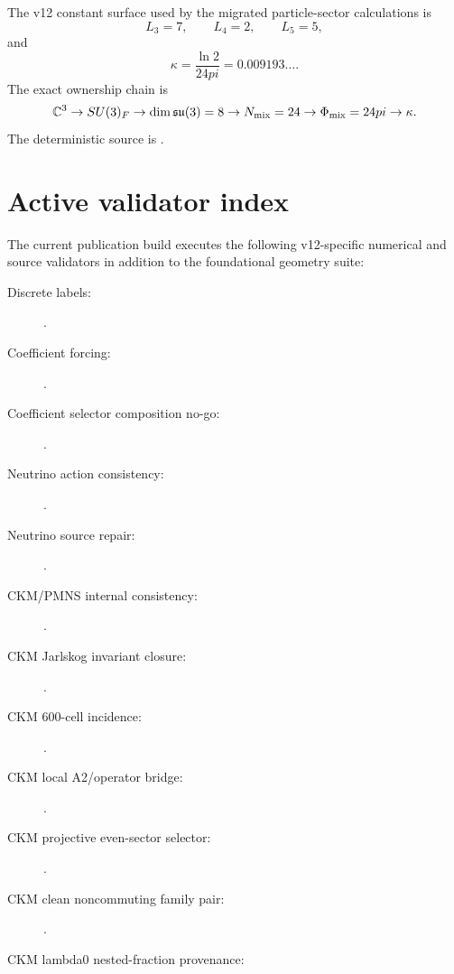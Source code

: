 \documentclass[11pt,a4paper,twoside]{book}
\def\pi{pi}%
\theoremstyle{definition}
\begin{document}
The v12 constant surface used by the migrated particle-sector calculations is
\[
L_3=7,\qquad L_4=2,\qquad L_5=5,
\]
and
\[
\boxed{
\kappa=\frac{\ln2}{24\pi}
=0.009193\ldots .
}
\]
The exact ownership chain is
\[
\mathbb C^3
\to SU(3)_F
\to \dim\mathfrak{su}(3)=8
\to N_{\rm mix}=24
\to\Phi_{\rm mix}=24\pi
\to\kappa.
\]
The deterministic source is
.

\section{Active validator index}

The current publication build executes the following v12-specific numerical and
source validators in addition to the foundational geometry suite:
\begin{description}
\item[Discrete labels:]
.
\item[Coefficient forcing:]
.
\item[Coefficient selector composition no-go:]
.
\item[Neutrino action consistency:]
.
\item[Neutrino source repair:]
.
\item[CKM/PMNS internal consistency:]
.
\item[CKM Jarlskog invariant closure:]
.
\item[CKM 600-cell incidence:]
.
\item[CKM local A2/operator bridge:]
.
\item[CKM projective even-sector selector:]
.
\item[CKM clean noncommuting family pair:]
.
\item[CKM lambda0 nested-fraction provenance:]

\end{description}
\end{document}
